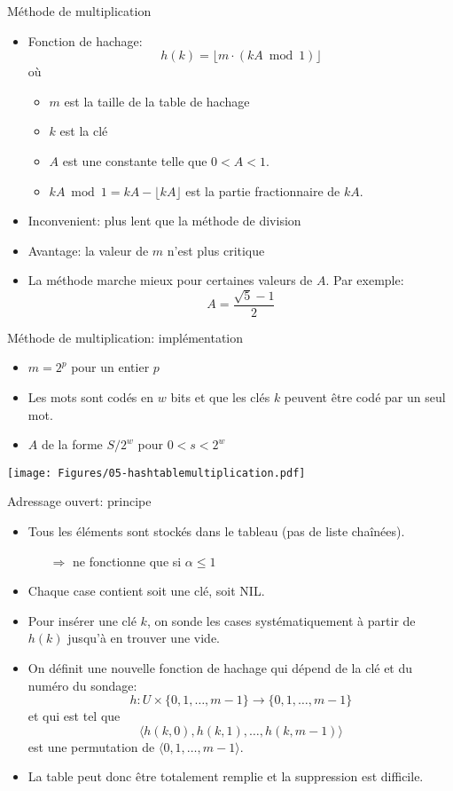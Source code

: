 \begin{frame}{Méthode de multiplication}
\begin{itemize}
\item Fonction de hachage:
$$h(k)=\lfloor m\cdot(k A \bmod 1)\rfloor$$
où
\begin{itemize}
\item $m$ est la taille de la table de hachage
\item $k$ est la clé
\item $A$ est une constante telle que $0<A<1$.
\item $k A \bmod 1=k A - \lfloor k A \rfloor$ est la partie
  fractionnaire de $kA$.
\end{itemize}
\item Inconvenient: plus lent que la méthode de division
\item Avantage: la valeur de $m$ n'est plus critique
\item La méthode marche mieux pour certaines valeurs de $A$. Par
  exemple:$$A=\frac{\sqrt{5}-1}{2}$$
\end{itemize}
\end{frame}

\begin{frame}{Méthode de multiplication: implémentation}
\begin{itemize}
\item $m=2^p$ pour un entier $p$
\item Les mots sont codés en $w$ bits et que les clés $k$ peuvent être codé par un seul mot.
\item $A$ de la forme $S/2^w$ pour $0<s<2^w$
\end{itemize}

\centerline{\texttt{[image: Figures/05-hashtablemultiplication.pdf]}}

\end{frame}

\begin{frame}{Adressage ouvert: principe}
\begin{itemize}
\item Tous les éléments sont stockés dans le tableau (pas de liste chaînées).
\begin{itemize}
\item[$\Rightarrow$] ne fonctionne que si $\alpha\leq 1$
\end{itemize}
\item Chaque case contient soit une clé, soit NIL.
\item Pour insérer une clé $k$, on sonde les cases
  systématiquement à partir de $h(k)$ jusqu'à en trouver une vide.
\item On définit une nouvelle fonction de hachage qui dépend de la clé et du numéro du sondage:
$$h:U\times\{0,1,\ldots,m-1\} \rightarrow \{0,1,\ldots,m-1\}$$
et qui est tel que
$$\langle h(k,0), h(k,1), \ldots, h(k,m-1)\rangle$$
est une permutation de $\langle 0, 1, \ldots, m-1\rangle$.
\item La table peut donc être totalement remplie et la suppression est difficile.
\end{itemize}
\end{frame}

